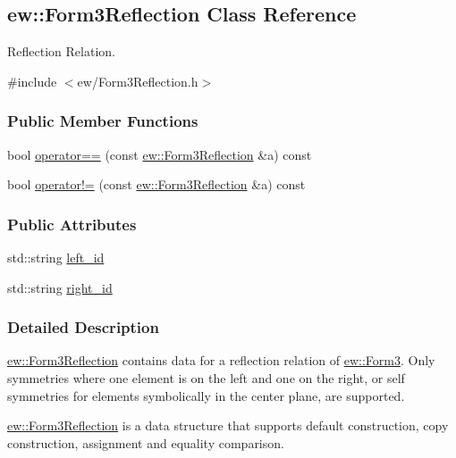 \hypertarget{classew_1_1Form3Reflection}{
\subsection{ew::Form3Reflection Class Reference}
\label{classew_1_1Form3Reflection}
}


Reflection Relation.  




{\ttfamily \#include $<$ew/Form3Reflection.h$>$}

\subsubsection*{Public Member Functions}
\begin{DoxyCompactItemize}
\item 
bool \hyperlink{classew_1_1Form3Reflection_a65215abac7b20e760f7813d83bbb5eb3}{operator==} (const \hyperlink{classew_1_1Form3Reflection}{ew::Form3Reflection} \&a) const 
\item 
bool \hyperlink{classew_1_1Form3Reflection_a14eaecbe50d5450d252d7522e9696250}{operator!=} (const \hyperlink{classew_1_1Form3Reflection}{ew::Form3Reflection} \&a) const 
\end{DoxyCompactItemize}
\subsubsection*{Public Attributes}
\begin{DoxyCompactItemize}
\item 
std::string \hyperlink{classew_1_1Form3Reflection_a92f7f975175f01b8479fa8d40a6fba72}{left\_\-id}
\item 
std::string \hyperlink{classew_1_1Form3Reflection_a81b3c3658154ec37de3f00b9af60e468}{right\_\-id}
\end{DoxyCompactItemize}


\subsubsection{Detailed Description}
\hyperlink{classew_1_1Form3Reflection}{ew::Form3Reflection} contains data for a reflection relation of \hyperlink{classew_1_1Form3}{ew::Form3}. Only symmetries where one element is on the left and one on the right, or self symmetries for elements symbolically in the center plane, are supported.

\hyperlink{classew_1_1Form3Reflection}{ew::Form3Reflection} is a data structure that supports default construction, copy construction, assignment and equality comparison. 

